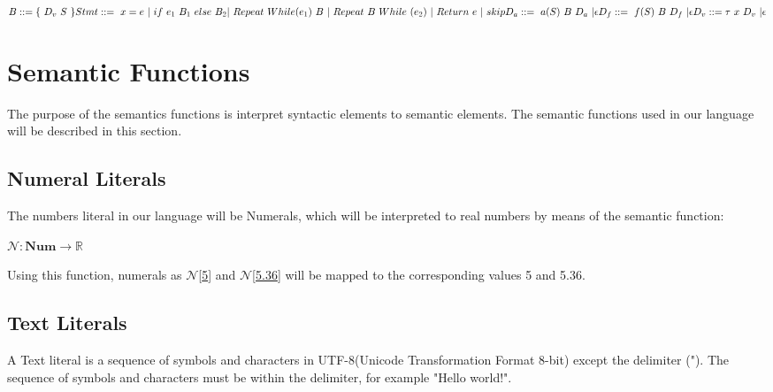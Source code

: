 \begin{math}
	B ::= \{ \ D_v  \ S \ \}
	\newline
	Stmt ::= \ x = e \ | \ if \ e_1 \ B_1 \ else \ B_2 \ \newline | \ Repeat \ While(e_1) \ B \ | \ Repeat \ B \ While \ (e_2) \ | \ Return \ e \ | \ skip
	\newline
	D_a ::= \ a(S) \ B \ D_a \ | \epsilon 
	\newline
	D_f ::= \ f(S) \ B \ D_f \ | \epsilon 
	\newline
	D_v ::= \tau \ x \ D_v \ | \epsilon 
	\newline
\end{math}
 
 \section{Semantic Functions}
 The purpose of the semantics functions is interpret syntactic elements to semantic elements. The semantic functions used in our language will be described in this section. 
  
  \subsection{Numeral Literals}
  The numbers literal in our language will be Numerals, which will be interpreted to real numbers by means of the semantic function: 
  
  \begin{math}
  \mathcal{N}: \textbf{Num} \rightarrow \mathbb{R}
  \end{math}
  
  Using this function, numerals as 
  \begin{math}
    \mathcal{N}
  \end{math}[\underline{5}] and 
  \begin{math}
    \mathcal{N}
  \end{math}[\underline{5.36}] will be mapped to the corresponding values 5 and 5.36. 
  
  
  \subsection{Text Literals}
  A Text literal is a sequence of symbols and characters in UTF-8(Unicode Transformation Format 8-bit) except the delimiter ("). The sequence of symbols and characters must be within the delimiter, for example "Hello world!". 
  
